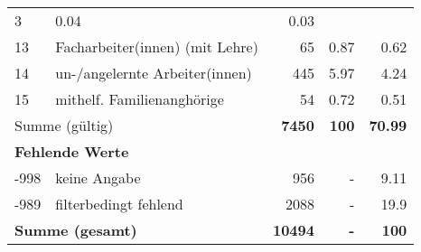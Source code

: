 \begin{longtable}{lXrrr}
       \num{3} &
       \num[round-mode=places,round-precision=2]{0.04} &
         \num[round-mode=places,round-precision=2]{0.03} \\

     13 &
     \multicolumn{1}{X}{ Facharbeiter(innen) (mit Lehre)   } &


       \num{65} &
       \num[round-mode=places,round-precision=2]{0.87} &
         \num[round-mode=places,round-precision=2]{0.62} \\

     14 &
     \multicolumn{1}{X}{ un-/angelernte Arbeiter(innen)   } &


       \num{445} &
       \num[round-mode=places,round-precision=2]{5.97} &
         \num[round-mode=places,round-precision=2]{4.24} \\

     15 &
     \multicolumn{1}{X}{ mithelf. Familienanghörige   } &


       \num{54} &
       \num[round-mode=places,round-precision=2]{0.72} &
         \num[round-mode=places,round-precision=2]{0.51} \\
     \midrule
     \multicolumn{2}{l}{Summe (gültig)} &
       \textbf{\num{7450}} &
     \textbf{\num{100}} &
       \textbf{\num[round-mode=places,round-precision=2]{70.99}} \\
     \multicolumn{5}{l}{\textbf{Fehlende Werte}}\\
       -998 &
       keine Angabe &
         \num{956} &
        - &
         \num[round-mode=places,round-precision=2]{9.11} \\
       -989 &
       filterbedingt fehlend &
         \num{2088} &
        - &
         \num[round-mode=places,round-precision=2]{19.9} \\
     \midrule
     \multicolumn{2}{l}{\textbf{Summe (gesamt)}} &
          \textbf{\num{10494}} &
        \textbf{-} &
        \textbf{\num{100}} \\
     \bottomrule
     \end{longtable}
     
